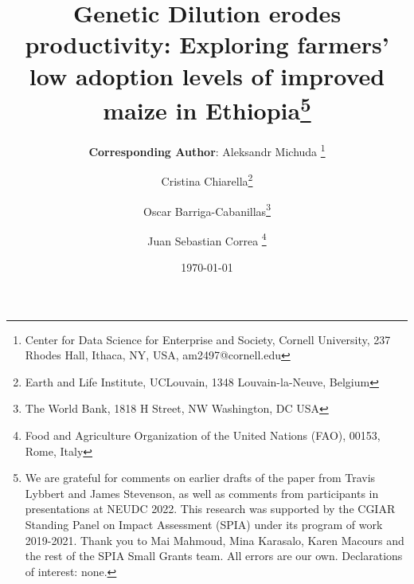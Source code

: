 \documentclass[11pt]{article}
\begin{document}
    \begin{titlepage}
    
    \title{Genetic Dilution erodes productivity: Exploring farmers' low adoption levels of improved maize in  Ethiopia\footnote{We are grateful for comments on earlier drafts of the paper from Travis Lybbert and James Stevenson, as well as comments from participants in presentations at NEUDC 2022. This research was supported by the CGIAR Standing Panel on Impact Assessment (SPIA) under its program of work 2019-2021. Thank you to Mai Mahmoud, Mina Karasalo, Karen Macours and the rest of the SPIA Small Grants team. All errors are our own. Declarations of interest: none.} }


\author{%
 \textbf{Corresponding Author}: Aleksandr Michuda \footnote{Center for Data Science for Enterprise and Society, Cornell University, 237 Rhodes Hall, Ithaca, NY, USA, am2497@cornell.edu}%
 \and Cristina Chiarella\footnote{Earth and Life Institute, UCLouvain, 1348 Louvain-la-Neuve, Belgium}%
 \and Oscar Barriga-Cabanillas\footnote{The World Bank, 1818 H Street, NW Washington, DC USA}%
  \and Juan Sebastian Correa \footnote{Food and Agriculture Organization of the United Nations (FAO), 00153, Rome, Italy}%
  }

	\date{\today}


\end{titlepage}
\end{document}
